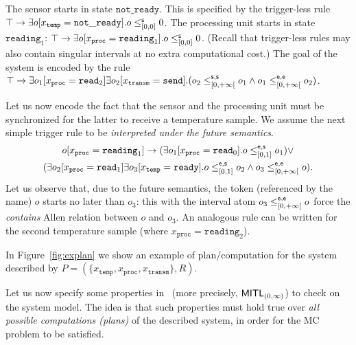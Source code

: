 \begin{example}
The sensor starts in state $\mathtt{not\_ready}$. This is specified by the trigger-less rule $\operatorname{\top}\to\exists o[x_\mathtt{temp} = \mathtt{not\_ready}]. o\leq^{\mathsf{s}}_{[0,0]} 0$. The processing unit starts in state $\mathtt{reading}_1$: $\operatorname{\top}\to\exists o[x_\mathtt{proc} = \mathtt{reading}_1]. o\leq^{\mathsf{s}}_{[0,0]} 0$.
(Recall that trigger-less rules may also contain singular intervals at no extra computational cost.)
The goal of the system is encoded by the rule
$\operatorname{\top}\to \exists o_1 [x_\mathtt{proc} = \mathtt{read}_2] \exists o_2 [x_\mathtt{transm} = \mathtt{send}]. (o_2 \leq^{\mathsf{s},\mathsf{s}}_{\mathopen[0,+\infty\mathclose[} o_1 \wedge o_1 \leq^{\mathsf{e},\mathsf{e}}_{\mathopen[0,+\infty\mathclose[} o_2)$.

Let us now encode the fact that the sensor and the processing unit must be synchronized for the latter to receive a temperature sample.
We assume the next simple trigger rule to be \emph{interpreted under the future semantics}.
\begin{multline}\label{eq:sync}
o[x_\mathtt{proc} = \mathtt{reading}_1] \to (\exists o_1[x_\mathtt{proc} = \mathtt{read}_0]. o \leq_{[0,1]}^{\mathsf{e},\mathsf{s}} o_1) \vee\\ (\exists o_2[x_\mathtt{proc} = \mathtt{read}_1] \exists o_3[x_\mathtt{temp} = \mathtt{ready}]. o \leq_{[0,1]}^{\mathsf{e},\mathsf{s}} o_2\wedge o_3\leq_{\mathopen[0,+\infty\mathclose[}^{\mathsf{e},\mathsf{e}} o).
\end{multline}
Let us observe that, due to the future semantics, the token (referenced by the name) $o$ starts no later than $o_3$: this with the interval atom \mbox{$o_3\leq_{\mathopen[0,+\infty\mathclose[}^{\mathsf{e},\mathsf{e}} o$} force the \emph{contains} Allen relation between $o$ and $o_3$.
An analogous rule can be written for the second temperature sample (where $x_\mathtt{proc}=\mathtt{reading}_2$).

In Figure~\ref{fig:explan} we show an example of plan/computation for the system described by $P=(\{x_\mathtt{temp},x_\mathtt{proc},x_\mathtt{transm}\},R)$.

Let us now specify some properties in \MITL\ (more precisely, $\text{\sffamily MITL}_{(0,\infty)}$) to check on the system model. The idea is that such properties must hold true over \emph{all possible computations (plans)} of the described system, in order for the MC problem to be satisfied.


\end{example}
